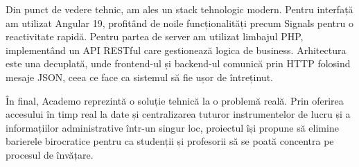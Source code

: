 Din punct de vedere tehnic, am ales un stack tehnologic modern. Pentru interfață am utilizat Angular 19, 
profitând de noile funcționalități precum Signals pentru o reactivitate rapidă. Pentru partea de server 
am utilizat limbajul PHP, implementând un API RESTful care gestionează logica de business. Arhitectura 
este una decuplată, unde frontend-ul și backend-ul comunică prin HTTP folosind mesaje JSON, 
ceea ce face ca sistemul să fie ușor de întreținut.

În final, Academo reprezintă o soluție tehnică la o problemă reală. Prin oferirea accesului în timp real 
la date și centralizarea tuturor instrumentelor de lucru și a informațiilor administrative într-un singur 
loc, proiectul își propune să elimine barierele birocratice pentru ca studenții și profesorii să se poată 
concentra pe procesul de învățare.

\newpage
